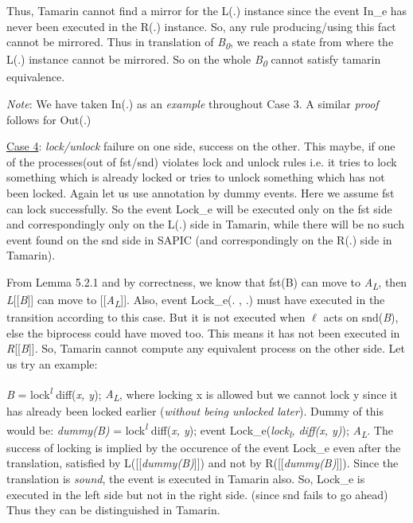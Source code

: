 \documentclass[11pt]{article}
\begin{document}
Thus, Tamarin cannot find a mirror for the L(.) instance since the event In\_e has never been executed in the R(.) instance. So, any rule producing/using this fact cannot be mirrored. Thus in translation of {\it B\textsubscript{0}}, we reach a state from where the L(.) instance cannot be mirrored. So on the whole {\it B\textsubscript{0}} cannot satisfy tamarin equivalence.\newline

{\it Note}: We have taken In(.) as an {\it example} throughout Case 3. A similar {\it proof} follows for Out(.)\newline

\underline{Case 4}: {\it lock/unlock} failure on one side, success on the other. This maybe, if one of the processes(out of fst/snd) violates lock and unlock rules i.e. it tries to lock something which is already locked or tries to unlock something which has not been locked. Again let us use annotation by dummy events. Here we assume fst can lock successfully. So the event Lock\_e will be executed only on the fst side and correspondingly only on the L(.) side in Tamarin, while there will be no such event found on the snd side in SAPIC (and correspondingly on the R(.) side in Tamarin).

From Lemma 5.2.1 and by correctness, we know that fst(B) can move to {\it A\textsubscript{L}}, then {\it L}[[{\it B}]] can move to [[{\it A\textsubscript{L}}]]. Also, event Lock\_e(. , .) must have executed in the transition according to this case. But it is not executed when $\ell$ acts on snd({\it B}), else the biprocess could have moved too. This means it has not been executed in {\it R}[[{\it B}]]. So, Tamarin cannot compute any equivalent process on the other side. Let us try an example:

{\it B} = lock\textsuperscript{{\it l}} diff({\it x, y}); {\it A\textsubscript{L}}, where locking x is allowed but we cannot lock y since it has already been locked earlier ({\it without being unlocked later}). Dummy of this would be: {\it dummy(B)} = lock\textsuperscript{{\it l}} diff({\it x, y}); event Lock\_e({\it lock\textsubscript{l}, diff({\it x, y})}); {\it A\textsubscript{L}}. The success of locking is implied by the occurence of the event Lock\_e even after the translation, satisfied by L([[{\it dummy(B)}]]) and not by R([[{\it dummy(B)}]]). Since the translation is {\it sound}, the event is executed in Tamarin also. So, Lock\_e is executed in the left side but not in the right side. (since snd fails to go ahead) Thus they can be distinguished in Tamarin. 
\end{document}
